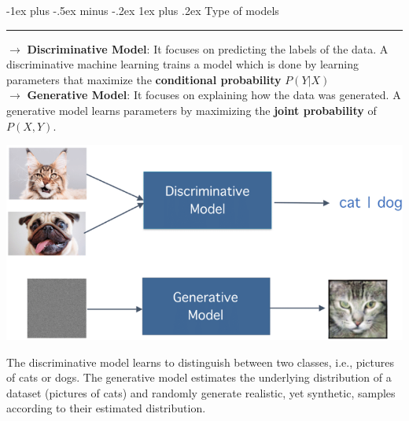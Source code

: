 \documentclass[letterpaper, 10.5pt,landscape]{article}
\makeatletter
\renewcommand{\subsubsection}{\@startsection{subsubsection}{3}{0mm}%
                                {-1ex plus -.5ex minus -.2ex}%
                                {1ex plus .2ex}%
                                {\normalfont\small\bfseries}}
\makeatother
\begin{document}
\begin{multicols*}{3}
\subsubsection{Type of models} {\color{teal}\hrule height 0.5pt} \smallskip

$\rightarrow$ \textbf{Discriminative Model}: It focuses on predicting the labels of the data. A discriminative machine learning trains a model which is done by learning parameters that maximize the \textbf{conditional probability} $P(Y|X)$ \\ 

$\rightarrow$ \textbf{Generative Model}: It focuses on explaining how the data was generated. A generative model learns parameters by maximizing the \textbf{joint probability} of $P(X, Y)$.
\vspace{-5pt}

\vspace{-5pt}
\begin{center}
    \begin{minipage}{0.8\linewidth}
    \includegraphics[width=\textwidth]{figures/Discriminant_Generative_Illustration.PNG}
    \end{minipage}
\end{center}
\vspace{-7pt}

The discriminative model learns to distinguish between two classes, i.e., pictures of cats or dogs. The generative model estimates the underlying distribution of a dataset (pictures of cats) and randomly generate realistic, yet synthetic, samples according to their estimated distribution.



\vspace{-7pt}




\end{multicols*}
\end{document}
